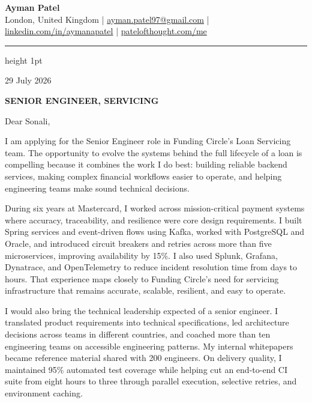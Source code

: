 \documentclass[a4paper,11pt]{article}
\begin{document}
\begin{center}
  {\LARGE \textbf{Ayman Patel}}\\
  \vspace{5pt}
  {\small
  London, United Kingdom \quad | \quad
  \href{mailto:ayman.patel97@gmail.com}{ayman.patel97@gmail.com} \quad | \quad
  \href{https://linkedin.com/in/aymanapatel}{linkedin.com/in/aymanapatel} \quad | \quad
  \href{https://patelofthought.com/me}{patelofthought.com/me}
  }
\end{center}

\vspace{-3pt}
{\color{teal}\hrule height 1pt}

\vspace{12pt}
29 July 2026

\vspace{8pt}
{\color{teal}\textbf{\MakeUppercase{Senior Engineer, Servicing}}}

\vspace{5pt}
Dear Sonali,

I am applying for the Senior Engineer role in Funding Circle's Loan Servicing team. The opportunity to evolve the systems behind the full lifecycle of a loan is compelling because it combines the work I do best: building reliable backend services, making complex financial workflows easier to operate, and helping engineering teams make sound technical decisions.

During six years at Mastercard, I worked across mission-critical payment systems where accuracy, traceability, and resilience were core design requirements. I built Spring services and event-driven flows using Kafka, worked with PostgreSQL and Oracle, and introduced circuit breakers and retries across more than five microservices, improving availability by 15\%. I also used Splunk, Grafana, Dynatrace, and OpenTelemetry to reduce incident resolution time from days to hours. That experience maps closely to Funding Circle's need for servicing infrastructure that remains accurate, scalable, resilient, and easy to operate.

I would also bring the technical leadership expected of a senior engineer. I translated product requirements into technical specifications, led architecture decisions across teams in different countries, and coached more than ten engineering teams on accessible engineering patterns. My internal whitepapers became reference material shared with 200 engineers. On delivery quality, I maintained 95\% automated test coverage while helping cut an end-to-end CI suite from eight hours to three through parallel execution, selective retries, and environment caching.
\end{document}
